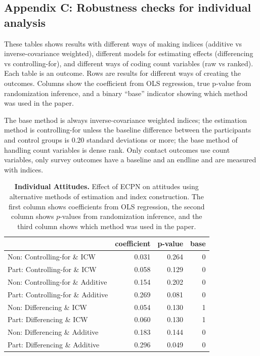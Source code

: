 \documentclass[
]{article}
\begin{document}
\hypertarget{appendix-c-robustness-checks-for-individual-analysis}{%
\subsection{Appendix C: Robustness checks for individual
analysis}\label{appendix-c-robustness-checks-for-individual-analysis}}

These tables shows results with different ways of making indices
(additive vs inverse-covariance weighted), different models for
estimating effects (differencing vs controlling-for), and different ways
of coding count variables (raw vs ranked). Each table is an outcome.
Rows are results for different ways of creating the outcomes. Columns
show the coefficient from OLS regression, true p-value from
randomization inference, and a binary ``base'' indicator showing which
method was used in the paper.

The base method is always inverse-covariance weighted indices; the
estimation method is controlling-for unless the baseline difference
between the participants and control groups is 0.20 standard deviations
or more; the base method of handling count variables is dense rank. Only
contact outcomes use count variables, only survey outcomes have a
baseline and an endline and are measured with indices.

\begin{table}[H]
\begin{center}
\label{tab:attitude_tab_ind}
\caption{\textbf{Individual Attitudes.} Effect of ECPN on attitudes using alternative methods of estimation and index construction. The first column shows coefficients from OLS regression, the second column shows $p$-values from randomization inference, and the third column shows which method was used in the paper.}
\smallskip

\begin{tabular}{l|r|r|r}
\hline
  & coefficient & p-value & base\\
\hline
Non: Controlling-for \& ICW & 0.031 & 0.264 & 0\\
\hline
Part: Controlling-for \& ICW & 0.058 & 0.129 & 0\\
\hline
Non: Controlling-for \& Additive & 0.154 & 0.202 & 0\\
\hline
Part: Controlling-for \& Additive & 0.269 & 0.081 & 0\\
\hline
Non: Differencing \& ICW & 0.054 & 0.130 & 1\\
\hline
Part: Differencing \& ICW & 0.060 & 0.130 & 1\\
\hline
Non: Differencing \& Additive & 0.183 & 0.144 & 0\\
\hline
Part: Differencing \& Additive & 0.296 & 0.049 & 0\\
\hline
\end{tabular}


\end{center}
\end{table}
\end{document}
